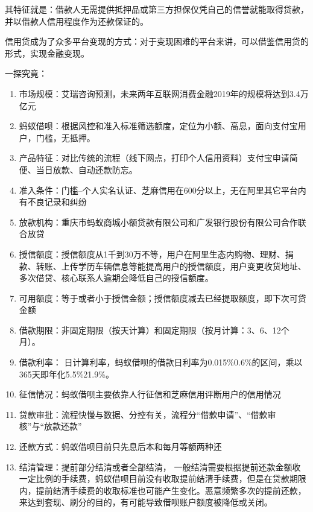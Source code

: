 \documentclass[letterpaper,10pt,english]{sphinxmanual}
\begin{document}
其特征就是：借款人无需提供抵押品或第三方担保仅凭自己的信誉就能取得贷款，并以借款人信用程度作为还款保证的。

信用贷成为了众多平台变现的方式：对于变现困难的平台来讲，可以借鉴信用贷的形式，实现金融变现。

一探究竟：
\begin{enumerate}
%
\item {} 
市场规模：艾瑞咨询预测，未来两年互联网消费金融2019年的规模将达到3.4万亿元

\item {} 
蚂蚁借呗：根据风控和准入标准筛选额度，定位为小额、高息，面向支付宝用户，门槛，无抵押。

\item {} 
产品特征：对比传统的流程（线下网点，打印个人信用资料）支付宝申请简便、当日放款、自动还款防忘。

\item {} 
准入条件：门槛–个人实名认证、芝麻信用在600分以上，无在阿里其它平台内有不良记录和纠纷

\item {} 
放款机构：重庆市蚂蚁商城小额贷款有限公司和广发银行股份有限公司合作联合放贷

\item {} 
授信额度：授信额度从1千到30万不等，用户在阿里生态内购物、理财、捐款、转账、上传学历车辆信息等能提高用户的授信额度，用户变更收货地址、多次借贷、核心联系人逾期会降低自己的授信额度。

\item {} 
可用额度：等于或者小于授信金额；授信额度减去已经提取额度，即下次可贷金额

\item {} 
借款期限：非固定期限（按天计算）和固定期限（按月计算：3、6、12个月）。

\item {} 
借款利率：
日计算利率，蚂蚁借呗的借款日利率为0.015\%\sphinxhyphen{}0.6\%的区间，乘以365天即年化5.5\%\sphinxhyphen{}21.9\%。

\item {} 
征信情况：蚂蚁借呗主要依靠人行征信和芝麻信用评断用户的信用情况

\item {} 
贷款审批：流程快慢与数据、分控有关，流程分“借款申请”、“借款审核”与“放款还款”

\item {} 
还款方式：蚂蚁借呗目前只先息后本和每月等额两种还

\item {} 
结清管理：提前部分结清或者全部结清，
一般结清需要根据提前还款金额收一定比例的手续费，蚂蚁借呗目前没有收取提前结清手续费，但是在贷款期限内，提前结清手续费的收取标准也可能产生变化。恶意频繁多次的提前还款，来达到套现、刷分的目的，有可能导致借呗账户额度被降低或关闭。


\end{enumerate}
\end{document}
